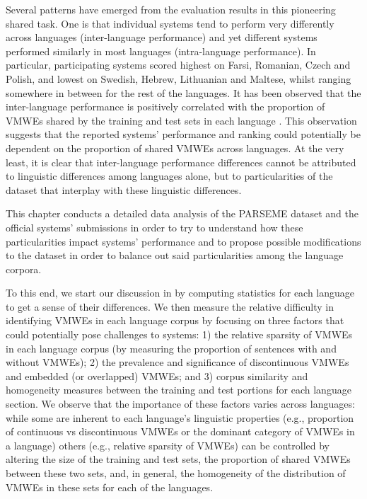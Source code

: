 \documentclass[output=paper
,modfonts
,nonflat,draftmode]{langsci/langscibook}
\begin{document}

Several patterns have emerged from the evaluation results in this pioneering shared task. One is that individual systems tend to perform very differently across languages (inter-language performance) and yet different systems performed similarly in most languages (intra-language performance). In particular, participating systems scored highest on Farsi, Romanian, Czech and Polish, and lowest on Swedish, Hebrew, Lithuanian and Maltese, whilst ranging somewhere in between for the rest of the languages. It has been observed that the inter-language performance is positively correlated with the proportion of VMWEs shared by the training and test sets in each language \citep{maldonado2017}. This observation suggests that the reported systems' performance and ranking could potentially be dependent on the proportion of shared VMWEs across languages. At the very least, it is clear that inter-language performance differences cannot be attributed to linguistic differences among languages alone, but to particularities of the dataset that interplay with these linguistic differences.

This chapter conducts a detailed data analysis of the PARSEME dataset and the official systems' submissions in order to try to understand how these particularities impact systems' performance and to propose possible modifications to the dataset in order to balance out said particularities among the language corpora.

To this end, we start our discussion in  by computing statistics for each language to get a sense of their differences. We then measure the relative difficulty in identifying VMWEs in each language corpus by focusing on three factors that could potentially pose challenges to systems: 1) the relative sparsity of VMWEs in each language corpus (by measuring the proportion of sentences with and without VMWEs); 2) the prevalence and significance of discontinuous VMWEs and embedded (or overlapped) VMWEs; and 3) corpus similarity and homogeneity measures between the training and test portions for each language section. We observe that the importance of these factors varies across languages: while some are inherent to each language's linguistic properties (e.g., proportion of continuous vs discontinuous VMWEs or the dominant category of VMWEs in a language) others (e.g., relative sparsity of VMWEs) can be controlled by altering the size of the training and test sets, the proportion of shared VMWEs between these two sets, and, in general, the homogeneity of the distribution of VMWEs in these sets for each of the languages.  
\end{document}
